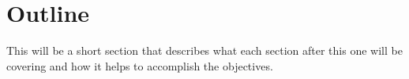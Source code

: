 \section{Outline}

This will be a short section that describes what each section after this one will be covering and how it helps to accomplish the objectives.

